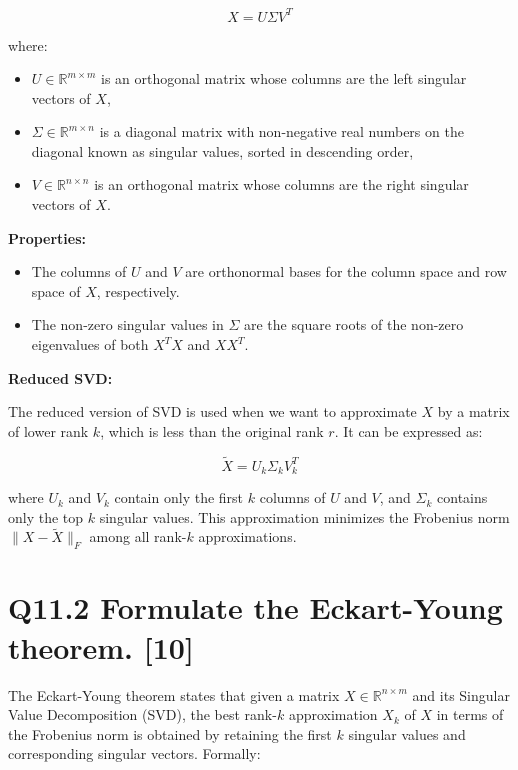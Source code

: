 \documentclass[11pt]{article}
\begin{document}
\[
X = U\Sigma V^T
\]

where:

\begin{itemize}
  \item \( U \in \mathbb{R}^{m \times m} \) is an orthogonal matrix whose columns are the left singular vectors of \( X \),
  \item \( \Sigma \in \mathbb{R}^{m \times n} \) is a diagonal matrix with non-negative real numbers on the diagonal known as singular values, sorted in descending order,
  \item \( V \in \mathbb{R}^{n \times n} \) is an orthogonal matrix whose columns are the right singular vectors of \( X \).
\end{itemize}

\textbf{Properties:}

\begin{itemize}
  \item The columns of \( U \) and \( V \) are orthonormal bases for the column space and row space of \( X \), respectively.
  \item The non-zero singular values in \( \Sigma \) are the square roots of the non-zero eigenvalues of both \( X^TX \) and \( XX^T \).
\end{itemize}

\textbf{Reduced SVD:}

The reduced version of SVD is used when we want to approximate \( X \) by a matrix of lower rank \( k \), which is less than the original rank \( r \). It can be expressed as:

\[
\tilde{X} = U_k \Sigma_k V_k^T
\]

where \( U_k \) and \( V_k \) contain only the first \( k \) columns of \( U \) and \( V \), and \( \Sigma_k \) contains only the top \( k \) singular values. This approximation minimizes the Frobenius norm \( \|X - \tilde{X}\|_F \) among all rank-\( k \) approximations.

\section{Q11.2 Formulate the Eckart-Young theorem. [10]}

The Eckart-Young theorem states that given a matrix \( X \in \mathbb{R}^{n \times m} \) and its Singular Value Decomposition (SVD), the best rank-\( k \) approximation \( X_k \) of \( X \) in terms of the Frobenius norm is obtained by retaining the first \( k \) singular values and corresponding singular vectors. Formally:
\end{document}
